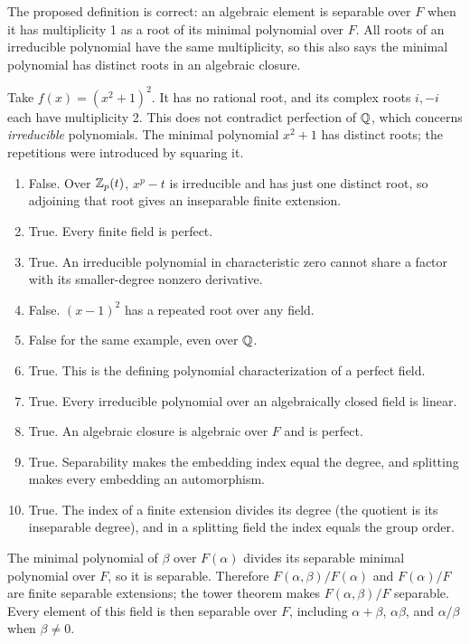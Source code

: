 The proposed definition is correct: an algebraic element is separable over $F$ when it has multiplicity 1 as a root of its minimal polynomial over $F$. All roots of an irreducible polynomial have the same multiplicity, so this also says the minimal polynomial has distinct roots in an algebraic closure.

Take $f(x)=(x^2+1)^2$. It has no rational root, and its complex roots $i,-i$ each have multiplicity 2. This does not contradict perfection of $\mathbb{Q}$, which concerns \emph{irreducible} polynomials. The minimal polynomial $x^2+1$ has distinct roots; the repetitions were introduced by squaring it.

\begin{enumerate}[label=(\alph*)]
\item False. Over $\mathbb{Z}_p(t)$, $x^p-t$ is irreducible and has just one distinct root, so adjoining that root gives an inseparable finite extension.
\item True. Every finite field is perfect.
\item True. An irreducible polynomial in characteristic zero cannot share a factor with its smaller-degree nonzero derivative.
\item False. $(x-1)^2$ has a repeated root over any field.
\item False for the same example, even over $\mathbb{Q}$.
\item True. This is the defining polynomial characterization of a perfect field.
\item True. Every irreducible polynomial over an algebraically closed field is linear.
\item True. An algebraic closure is algebraic over $F$ and is perfect.
\item True. Separability makes the embedding index equal the degree, and splitting makes every embedding an automorphism.
\item True. The index of a finite extension divides its degree (the quotient is its inseparable degree), and in a splitting field the index equals the group order.
\end{enumerate}

The minimal polynomial of $\beta$ over $F(\alpha)$ divides its separable minimal polynomial over $F$, so it is separable. Therefore $F(\alpha,\beta)/F(\alpha)$ and $F(\alpha)/F$ are finite separable extensions; the tower theorem makes $F(\alpha,\beta)/F$ separable. Every element of this field is then separable over $F$, including $\alpha+\beta$, $\alpha\beta$, and $\alpha/\beta$ when $\beta\ne0$.

